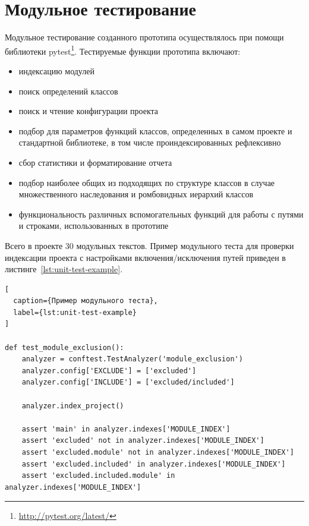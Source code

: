 \section{Модульное тестирование}
\label{sec:unit-testing}

Модульное тестирование созданного прототипа осуществлялось при помощи библиотеки
pytest\footnote{\url{http://pytest.org/latest/}}.  Тестируемые функции прототипа
включают:

\begin{itemize}
    \item индексацию модулей
    \item поиск определений классов
    \item поиск и чтение конфигурации проекта
    \item подбор для параметров функций классов, определенных в самом проекте и
      стандартной библиотеке, в том числе проиндексированных рефлексивно
    \item сбор статистики и форматирование отчета
    \item подбор наиболее общих из подходящих по структуре классов в случае
      множественного наследования и ромбовидных иерархий классов
    \item функциональность различных вспомогательных функций для работы с
      путями и строками, использованных в прототипе
\end{itemize}

Всего в проекте 30 модульных текстов. Пример модульного теста для проверки
индексации проекта с настройками включения/исключения путей приведен в
листинге~\ref{lst:unit-test-example}.

\begin{lstlisting}[
  caption={Пример модульного теста},
  label={lst:unit-test-example}
]

def test_module_exclusion():
    analyzer = conftest.TestAnalyzer('module_exclusion')
    analyzer.config['EXCLUDE'] = ['excluded']
    analyzer.config['INCLUDE'] = ['excluded/included']

    analyzer.index_project()

    assert 'main' in analyzer.indexes['MODULE_INDEX']
    assert 'excluded' not in analyzer.indexes['MODULE_INDEX']
    assert 'excluded.module' not in analyzer.indexes['MODULE_INDEX']
    assert 'excluded.included' in analyzer.indexes['MODULE_INDEX']
    assert 'excluded.included.module' in analyzer.indexes['MODULE_INDEX']

\end{lstlisting}
